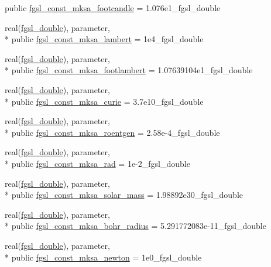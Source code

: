 \begin{DoxyCompactItemize}
public \hyperlink{classfgsl_aed42c585eae8fbc1ddd6baf9d539408f}{fgsl\-\_\-const\-\_\-mksa\-\_\-footcandle} = 1.\-076e1\-\_\-fgsl\-\_\-double
\item 
real(\hyperlink{classfgsl_a9af5113378e0f000eb479d3f90196ddf}{fgsl\-\_\-double}), parameter, \\*
public \hyperlink{classfgsl_abb530767690eea1cf7e8d6d99141ae41}{fgsl\-\_\-const\-\_\-mksa\-\_\-lambert} = 1e4\-\_\-fgsl\-\_\-double
\item 
real(\hyperlink{classfgsl_a9af5113378e0f000eb479d3f90196ddf}{fgsl\-\_\-double}), parameter, \\*
public \hyperlink{classfgsl_a5362c5c67d790eba885afc839e76df4a}{fgsl\-\_\-const\-\_\-mksa\-\_\-footlambert} = 1.\-07639104e1\-\_\-fgsl\-\_\-double
\item 
real(\hyperlink{classfgsl_a9af5113378e0f000eb479d3f90196ddf}{fgsl\-\_\-double}), parameter, \\*
public \hyperlink{classfgsl_a96bbfcd3e0e6a9190e86a1a909b7407b}{fgsl\-\_\-const\-\_\-mksa\-\_\-curie} = 3.\-7e10\-\_\-fgsl\-\_\-double
\item 
real(\hyperlink{classfgsl_a9af5113378e0f000eb479d3f90196ddf}{fgsl\-\_\-double}), parameter, \\*
public \hyperlink{classfgsl_a0b3f21e2d3493c6d7662dbe77ab1fbe6}{fgsl\-\_\-const\-\_\-mksa\-\_\-roentgen} = 2.\-58e-\/4\-\_\-fgsl\-\_\-double
\item 
real(\hyperlink{classfgsl_a9af5113378e0f000eb479d3f90196ddf}{fgsl\-\_\-double}), parameter, \\*
public \hyperlink{classfgsl_a46fbda29caeb0f9c75253f461d340353}{fgsl\-\_\-const\-\_\-mksa\-\_\-rad} = 1e-\/2\-\_\-fgsl\-\_\-double
\item 
real(\hyperlink{classfgsl_a9af5113378e0f000eb479d3f90196ddf}{fgsl\-\_\-double}), parameter, \\*
public \hyperlink{classfgsl_accd84d0687faa8d8009cb69525c2c81d}{fgsl\-\_\-const\-\_\-mksa\-\_\-solar\-\_\-mass} = 1.\-98892e30\-\_\-fgsl\-\_\-double
\item 
real(\hyperlink{classfgsl_a9af5113378e0f000eb479d3f90196ddf}{fgsl\-\_\-double}), parameter, \\*
public \hyperlink{classfgsl_a52a0f9900118e47b537d0ee98ba88780}{fgsl\-\_\-const\-\_\-mksa\-\_\-bohr\-\_\-radius} = 5.\-291772083e-\/11\-\_\-fgsl\-\_\-double
\item 
real(\hyperlink{classfgsl_a9af5113378e0f000eb479d3f90196ddf}{fgsl\-\_\-double}), parameter, \\*
public \hyperlink{classfgsl_a502e10d884393483a5f705039802ef9f}{fgsl\-\_\-const\-\_\-mksa\-\_\-newton} = 1e0\-\_\-fgsl\-\_\-double

\end{DoxyCompactItemize}
